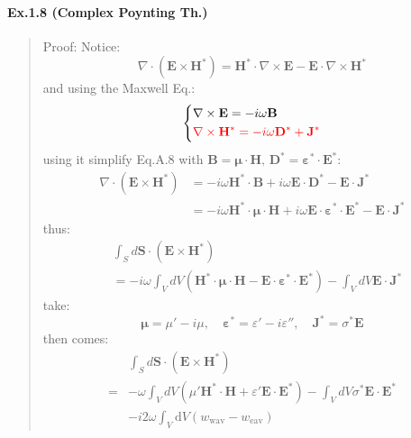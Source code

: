 \documentclass[11pt,a4paper,oneside]{book}
\begin{document}
\newpage

\paragraph{Ex.1.8 (Complex Poynting Th.)}
\begin{quotation}
	Proof: Notice:\begin{equation}
		\nabla \cdot\left(\mathbf{E} \times \mathbf{H}^*\right)=\mathbf{H}^* \cdot \nabla \times \mathbf{E}-\mathbf{E} \cdot \nabla \times \mathbf{H}^*
	\end{equation}
	and using the Maxwell Eq.:\begin{equation}\left\{
		\begin{aligned}
		&\nabla \times \mathbf{E}  =-i \omega \mathbf{B} \\
		&\textcolor{red}{\nabla \times \mathbf{H}^*  =-i \omega \mathbf{D}^*+\mathbf{J}^*}
		\end{aligned}\right.
	\end{equation}
	using it simplify Eq.A.8 with $\mathbf{B}={\boldsymbol{\mu}} \cdot \mathbf{H}, \, \mathbf{D}^*={\boldsymbol{\varepsilon}}^* \cdot \mathbf{E}^*$:\begin{equation}
		\begin{aligned}
\nabla \cdot\left(\mathbf{E} \times \mathbf{H}^*\right) & =-i \omega \mathbf{H}^* \cdot \mathbf{B}+i \omega \mathbf{E} \cdot \mathbf{D}^*-\mathbf{E} \cdot \mathbf{J}^* \\
& =-i \omega \mathbf{H}^* \cdot {\boldsymbol{\mu}} \cdot \mathbf{H}+i \omega \mathbf{E} \cdot {\boldsymbol{\varepsilon}}^* \cdot \mathbf{E}^*-\mathbf{E} \cdot \mathbf{J}^*
\end{aligned}
	\end{equation}
	thus:\begin{equation}
		\begin{aligned}
			&\int_S d \mathbf{S} \cdot\left(\mathbf{E} \times \mathbf{H}^*\right)\\&=-i \omega \int_V d V\left(\mathbf{H}^* \cdot {\boldsymbol{\mu}} \cdot \mathbf{H}-\mathbf{E} \cdot {\boldsymbol{\varepsilon}}^* \cdot \mathbf{E}^*\right)-\int_V d V \mathbf{E} \cdot \mathbf{J}^*
		\end{aligned}
	\end{equation}
	take:\begin{equation}
		{\boldsymbol{\mu}}=\mu'-i\mu,\quad\boldsymbol{\varepsilon}^*=\varepsilon'-i\varepsilon'',\quad \mathbf{J}^*=\sigma^*\mathbf{E}
	\end{equation}
	then comes:\begin{equation}
		\begin{aligned}
			&\int_S d \mathbf{S} \cdot\left(\mathbf{E} \times \mathbf{H}^*\right)\\=&- \omega \int_V d V\left(\mu'\mathbf{H}^* \cdot \mathbf{H}+\varepsilon'\mathbf{E}\cdot \mathbf{E}^*\right)-\int_V d V \sigma^*\mathbf{E} \cdot \mathbf{E}^*\\
			&-i2\omega\int_V\text{d}V(w_{\text{wav}}-w_{\text{eav}})
		\end{aligned}
	\end{equation}
\end{quotation}
\end{document}
